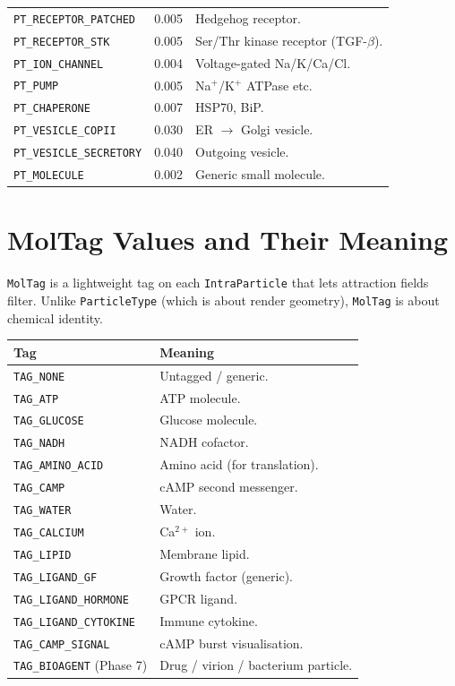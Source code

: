 \documentclass[11pt,letterpaper,twoside,openany]{book}
\newcommand{\code}[1]{\texttt{#1}}
\begin{document}
\begin{longtable}{p{4.5cm}p{1.5cm}p{8.0cm}}
\code{PT\_RECEPTOR\_PATCHED} & 0.005 & Hedgehog receptor.\\
\code{PT\_RECEPTOR\_STK}   & 0.005 & Ser/Thr kinase receptor (TGF-$\beta$).\\
\code{PT\_ION\_CHANNEL}    & 0.004 & Voltage-gated Na/K/Ca/Cl.\\
\code{PT\_PUMP}            & 0.005 & Na$^+$/K$^+$ ATPase etc.\\
\code{PT\_CHAPERONE}       & 0.007 & HSP70, BiP.\\
\code{PT\_VESICLE\_COPII}  & 0.030 & ER $\to$ Golgi vesicle.\\
\code{PT\_VESICLE\_SECRETORY} & 0.040 & Outgoing vesicle.\\
\code{PT\_MOLECULE}        & 0.002 & Generic small molecule.\\
\bottomrule
\end{longtable}

\chapter{MolTag Values and Their Meaning}
\label{ch:moltag}

\code{MolTag} is a lightweight tag on each \code{IntraParticle} that
lets attraction fields filter. Unlike \code{ParticleType} (which is
about render geometry), \code{MolTag} is about chemical identity.

\begin{longtable}{p{3.5cm}p{10.5cm}}
\toprule
\textbf{Tag} & \textbf{Meaning}\\ \midrule
\code{TAG\_NONE}        & Untagged / generic.\\
\code{TAG\_ATP}         & ATP molecule.\\
\code{TAG\_GLUCOSE}     & Glucose molecule.\\
\code{TAG\_NADH}        & NADH cofactor.\\
\code{TAG\_AMINO\_ACID} & Amino acid (for translation).\\
\code{TAG\_CAMP}        & cAMP second messenger.\\
\code{TAG\_WATER}       & Water.\\
\code{TAG\_CALCIUM}     & Ca$^{2+}$ ion.\\
\code{TAG\_LIPID}       & Membrane lipid.\\
\code{TAG\_LIGAND\_GF}       & Growth factor (generic).\\
\code{TAG\_LIGAND\_HORMONE}  & GPCR ligand.\\
\code{TAG\_LIGAND\_CYTOKINE} & Immune cytokine.\\
\code{TAG\_CAMP\_SIGNAL}     & cAMP burst visualisation.\\
\code{TAG\_BIOAGENT} (Phase 7) & Drug / virion / bacterium particle.\\
\bottomrule
\end{longtable}
\end{document}
